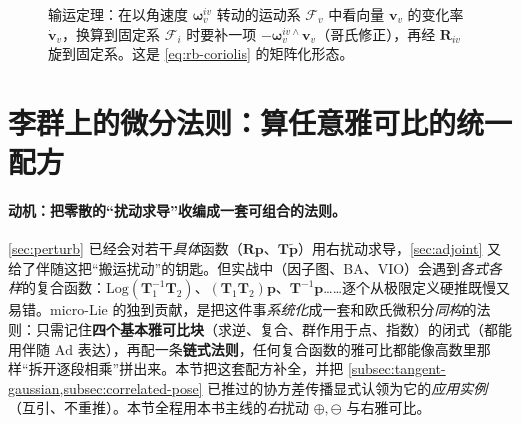 \begin{figure}[ht]
\centering
{}
\caption{输运定理：在以角速度 $\boldsymbol{\omega}_v^{iv}$ 转动的运动系 $\mathcal{F}_v$ 中看向量 $\mathbf{v}_v$ 的变化率 $\dot{\mathbf{v}}_v$，换算到固定系 $\mathcal{F}_i$ 时要补一项 $-\boldsymbol{\omega}_v^{iv\wedge}\mathbf{v}_v$（哥氏修正），再经 $\mathbf{R}_{iv}$ 旋到固定系。这是 \cref{eq:rb-coriolis} 的矩阵化形态。}
\label{fig:lie-transport}
\end{figure}

\section{李群上的微分法则：算任意雅可比的统一配方}
\label{sec:lie-diff-rules}

\paragraph{动机：把零散的“扰动求导”收编成一套可组合的法则。}
\cref{sec:perturb} 已经会对若干\emph{具体}函数（$\mathbf{R}\mathbf{p}$、$\mathbf{T}\tilde{\mathbf{p}}$）用右扰动求导，\cref{sec:adjoint} 又给了伴随这把“搬运扰动”的钥匙。但实战中（因子图、BA、VIO）会遇到\emph{各式各样}的复合函数：$\mathrm{Log}(\mathbf{T}_1^{-1}\mathbf{T}_2)$、$(\mathbf{T}_1\mathbf{T}_2)\mathbf{p}$、$\mathbf{T}^{-1}\mathbf{p}$……逐个从极限定义硬推既慢又易错。micro-Lie\cite{sola2018micro} 的独到贡献，是把这件事\emph{系统化}成一套和欧氏微积分\emph{同构}的法则：只需记住\textbf{四个基本雅可比块}（求逆、复合、群作用于点、指数）的闭式（都能用伴随 $\mathrm{Ad}$ 表达），再配一条\textbf{链式法则}，任何复合函数的雅可比都能像高数里那样“拆开逐段相乘”拼出来。本节把这套配方补全，并把 \cref{subsec:tangent-gaussian,subsec:correlated-pose} 已推过的协方差传播显式认领为它的\emph{应用实例}（互引、不重推）。本节全程用本书主线的\emph{右}扰动 $\oplus,\ominus$ 与右雅可比。

